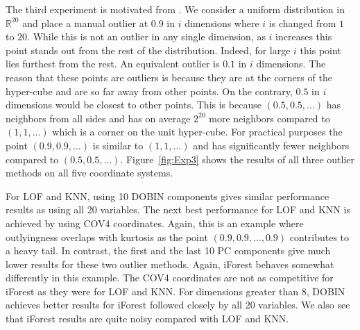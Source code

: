 \documentclass[letter,12pt]{article}
\begin{document}
The third experiment is motivated from \cite{zimek2012survey}. We consider a uniform distribution in $\mathbb{R}^{20}$ and place a manual outlier at $0.9$ in $i$ dimensions where $i$ is changed from $1$ to $20$. While this is not an outlier in any single dimension, as $i$ increases this point stands out from the rest of the distribution. Indeed, for large $i$ this point lies furthest from the rest. An equivalent outlier is $0.1$ in $i$ dimensions. The reason that these points are outliers is because they are at the corners of the hyper-cube and are so far away from other points. On the contrary, $0.5$ in $i$ dimensions would be closest to other points. This is because $(0.5, 0.5, \dots)$ has neighbors from all sides and has on average $2^{20}$ more neighbors compared to $(1, 1, \dots)$ which is a corner on the unit hyper-cube. For practical purposes the point $(0.9, 0.9, \dots)$ is similar to $(1, 1, \dots)$ and has significantly {\color{blue} fewer } neighbors compared to $(0.5, 0.5, \dots)$. Figure~\ref{fig:Exp3} shows the results of all three outlier methods on all {\color{blue} five } coordinate systems. %

{\color{blue} For LOF and KNN, using 10 DOBIN components gives similar performance results as using all 20 variables. The next best performance for LOF and KNN is achieved by using COV4 coordinates. Again, this is an example where outlyingness overlaps with kurtosis as the point $(0.9, 0.9, \ldots, 0.9)$ contributes to a heavy tail. In contrast, the first and the last 10 PC components give much lower results for these two outlier methods. Again, iForest behaves somewhat differently in this example. The COV4 coordinates are not as competitive for iForest as they were for LOF and KNN. For dimensions greater than 8, DOBIN achieves better results for iForest followed closely by all 20 variables.  We also see that iForest results are quite noisy compared with LOF and KNN. }
\end{document}
